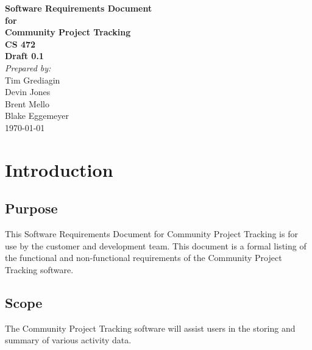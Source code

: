 \documentclass[12pt]{article}
\begin{document}
\begin{titlepage}
\begin{flushright} 
{\LARGE \bfseries Software Requirements Document}\\[1.2cm]
{\large \bfseries for}\\[1.2cm]
{\huge \bfseries Community Project Tracking}\\[1.2cm]
{\large \bfseries CS 472}\\
\vfill
{\large \bfseries Draft 0.1}\\[2cm]
\emph{Prepared by:} \\
Tim Grediagin\\
Devin Jones\\
Brent Mello\\
Blake Eggemeyer \\ [3cm]
{\large \today}
\\[2cm]
\end{flushright}
\end{titlepage}
\setcounter{tocdepth}{3}
\setcounter{secnumdepth}{4}
\tableofcontents
\newpage
\section{Introduction}

\subsection{Purpose}
This Software Requirements Document for Community Project Tracking is for use by the customer and development team. This document is a formal listing of the functional and non-functional requirements of the Community Project Tracking software.

\subsection{Scope}
The Community Project Tracking software will assist users in the storing and summary of various activity data.
\end{document}

